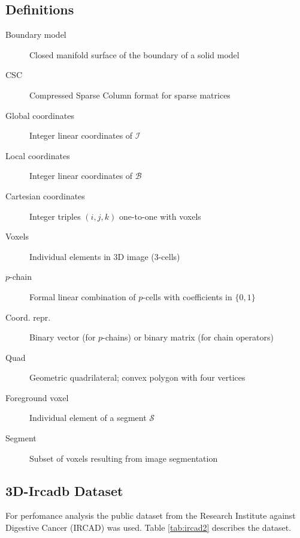 \subsection{Definitions}
\begin{description}
\item[Boundary model] Closed manifold surface of the boundary of a solid model
\vspace{-2.5mm}\item[CSC]  Compressed Sparse Column format for sparse matrices
\vspace{-2.5mm}\item[Global coordinates]  Integer linear coordinates of $\mathcal{I}$
\vspace{-2.5mm}\item[Local coordinates] Integer linear coordinates of $\mathcal{B}$
\vspace{-2.5mm}\item[Cartesian coordinates] Integer triples $(i,j,k)$ one-to-one with voxels
\vspace{-2.5mm}\item[Voxels] Individual elements in 3D image (3-cells)
\vspace{-2.5mm}\item[$p$-chain] Formal linear combination of $p$-cells with coefficients in $\{0,1\}$
\vspace{-2.5mm}\item[Coord. repr.]  Binary vector (for $p$-chains) or binary matrix (for chain operators)
\vspace{-2.5mm}\item[Quad]	Geometric quadrilateral; convex polygon with four vertices
\vspace{-2.5mm}\item[Foreground voxel] Individual element of a segment $\mathcal{S}$
\vspace{-2.5mm}\item[Segment]	Subset of voxels resulting from image segmentation
\end{description}

\subsection{3D-Ircadb Dataset}

For perfomance analysis the public dataset from the Research Institute against Digestive Cancer (IRCAD) \cite{ircadb} was used. 
Table 
\ref{tab:ircad2} describes the dataset.


